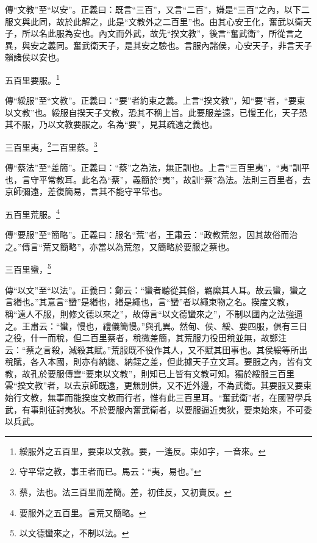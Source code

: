 {\noindent\zhuan{}\fzbyks 傳“文教”至“以安”。正義曰：既言“三百”，又言“二百”，嫌是“三百”之內，以下二服文與此同，故於此解之，此是“文教外之二百里”也。由其心安王化，奮武以衛天子，所以名此服為安也。內文而外武，故先“揆文教”，後言“奮武衛”，所從言之異，與安之義同。奮武衛天子，是其安之驗也。言服內諸侯，心安天子，非言天子賴諸侯以安也。 \par}

五百里要服。\footnote{綏服外之五百里，要束以文教。要，一遙反。束如字，一音來。}

{\noindent\zhuan{}\fzbyks 傳“綏服”至“文教”。正義曰：“要”者約束之義。上言“揆文教”，知“要”者，“要束以文教”也。綏服自揆天子文教，恐其不稱上旨。此要服差遠，已慢王化，天子恐其不服，乃以文教要服之。名為“要”，見其疏遠之義也。 \par}

三百里夷，\footnote{守平常之教，事王者而已。馬云：“夷，易也。”}二百里蔡。\footnote{蔡，法也。法三百里而差簡。差，初佳反，又初賣反。}

{\noindent\zhuan{}\fzbyks 傳“蔡法”至“差簡”。正義曰：“蔡”之為法，無正訓也。上言“三百里夷”，“夷”訓平也，言守平常教耳。此名為“蔡”，義簡於“夷”，故訓“蔡”為法。法則三百里者，去京師彌遠，差復簡易，言其不能守平常也。 \par}

五百里荒服。\footnote{要服外之五百里。言荒又簡略。}

{\noindent\zhuan{}\fzbyks 傳“要服”至“簡略”。正義曰：服名“荒”者，王肅云：“政教荒忽，因其故俗而治之。”傳言“荒又簡略”，亦當以為荒忽，又簡略於要服之蔡也。 \par}

三百里蠻，\footnote{以文德蠻來之，不制以法。}

{\noindent\zhuan{}\fzbyks 傳“以文”至“以法”。正義曰：鄭云：“蠻者聽從其俗，羈縻其人耳。故云蠻，蠻之言緡也。”其意言“蠻”是緡也，緡是繩也，言“蠻”者以繩束物之名。揆度文教，稱“遠人不服，則修文德以來之”，故傳言“以文德蠻來之”，不制以國內之法強逼之。王肅云：“蠻，慢也，禮儀簡慢。”與孔異。然甸、侯、綏、要四服，俱有三日之役，什一而稅，但二百里蔡者，稅微差簡，其荒服力役田稅並無，故鄭注云：“蔡之言殺，減殺其賦。”荒服既不役作其人，又不賦其田事也。其侯綏等所出稅賦，各入本國，則亦有納緫、納銍之差，但此據天子立文耳。要服之內，皆有文教，故孔於要服傳雲“要束以文教”，則知已上皆有文教可知。獨於綏服三百里雲“揆文教”者，以去京師既遠，更無別供，又不近外邊，不為武衛。其要服又要束始行文教，無事而能揆度文教而行者，惟有此三百里耳。“奮武衛”者，在國習學兵武，有事則征討夷狄。不於要服內奮武衛者，以要服逼近夷狄，要束始來，不可委以兵武。 \par}

